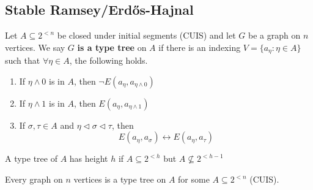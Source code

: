 \documentclass{article}
\begin{document}
\subsection{Stable Ramsey/\texorpdfstring{Erd\H{o}s}{Erdos}-Hajnal}
\begin{defi}
  Let $A \subseteq 2^{<n}$ be closed under initial segments (CUIS) and let $G$ be a graph on $n$ vertices.
  We say $G$ \textbf{is a type tree} on $A$ if there is an indexing $V = \{a_\eta : \eta \in A\}$ such that $\forall \eta \in A$, the following holds.
  \begin{enumerate}[label=(\arabic*)]
    \item If $\eta \wedge 0$ is in $A$, then $\neg E(a_\eta, a_{\eta \wedge 0})$
    \item If $\eta \wedge 1$ is in $A$, then $E(a_\eta, a_{\eta \wedge 1})$
    \item If $\sigma,\tau \in A$ and $\eta \lhd \sigma \lhd \tau$, then
      \begin{equation*}
        E(a_\eta, a_\sigma) \leftrightarrow E(a_\eta, a_\tau)
      \end{equation*}
  \end{enumerate}
  A type tree of $A$ has height $h$ if $A \subseteq 2^{<h}$ but $A \nsubseteq 2^{<h-1}$
\end{defi}
\begin{lemma}
  Every graph on $n$ vertices is a type tree on $A$ for some $A \subseteq 2^{<n}$ (CUIS).
\end{lemma}
\end{document}
